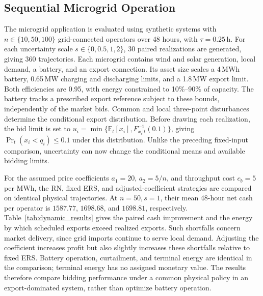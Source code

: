 \documentclass[journal]{IEEEtran}
\begin{document}
\subsection{Sequential Microgrid Operation}
\label{sec:dynamic_study}
The microgrid application is evaluated using synthetic systems with $n\in\{10,50,100\}$ grid-connected operators over 48 hours, with $\tau=0.25$\,h. For each uncertainty scale $s\in\{0,0.5,1,2\}$, 30 paired realizations are generated, giving 360 trajectories. Each microgrid contains wind and solar generation, local demand, a battery, and an export connection. Its asset size scales a 4\,MWh battery, 0.65\,MW charging and discharging limits, and a 1.8\,MW export limit. Both efficiencies are 0.95, with energy constrained to 10\%--90\% of capacity. The battery tracks a prescribed export reference subject to these bounds, independently of the market bids. Common and local three-point disturbances determine the conditional export distribution. Before drawing each realization, the bid limit is set to $u_i=\min\{\mathbb E_t[x_i],F^{-1}_{x_i|t}(0.1)\}$, giving $\Pr_t(x_i<q_i)\leq0.1$ under this distribution. Unlike the preceding fixed-input comparison, uncertainty can now change the conditional means and available bidding limits.

For the assumed price coefficients $a_1=20$, $a_2=5/n$, and throughput cost $c_b=5$ per MWh, the RN, fixed ERS, and adjusted-coefficient strategies are compared on identical physical trajectories. At $n=50,s=1$, their mean 48-hour net cash per operator is $1587.77$, $1698.68$, and $1698.81$, respectively. Table~\ref{tab:dynamic_results} gives the paired cash improvement and the energy by which scheduled exports exceed realized exports. Such shortfalls concern market delivery, since grid imports continue to serve local demand. Adjusting the coefficient increases profit but also slightly increases these shortfalls relative to fixed ERS. Battery operation, curtailment, and terminal energy are identical in the comparison; terminal energy has no assigned monetary value. The results therefore compare bidding performance under a common physical policy in an export-dominated system, rather than optimize battery operation.
\end{document}
